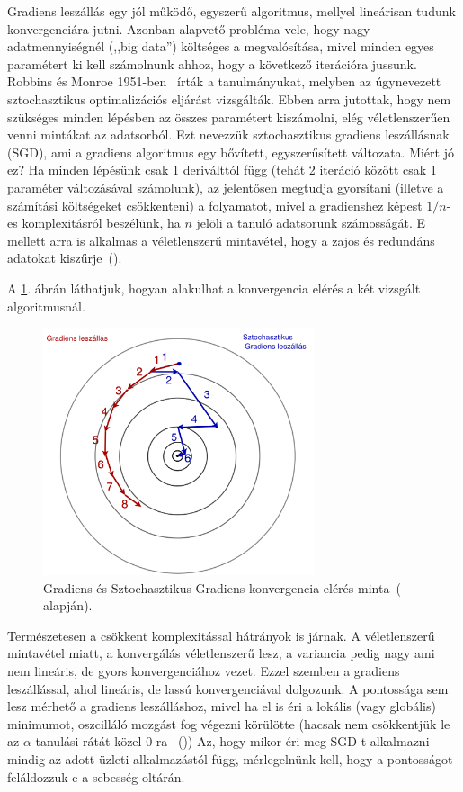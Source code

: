 \documentclass[a4paper,12pt]{article}
\begin{document}
Gradiens leszállás egy jól működő, egyszerű algoritmus, mellyel lineárisan tudunk konvergenciára jutni. Azonban alapvető probléma vele, hogy nagy adatmennyiségnél (,,big data'') költséges a megvalósítása, mivel minden egyes paramétert ki kell számolnunk ahhoz, hogy a következő iterációra jussunk. Robbins és Monroe 1951-ben~\cite{stoch1951} írták a tanulmányukat, melyben az úgynevezett sztochasztikus optimalizációs eljárást vizsgálták. Ebben arra jutottak, hogy nem szükséges minden lépésben az összes paramétert kiszámolni, elég véletlenszerűen venni mintákat az adatsorból. Ezt nevezzük sztochasztikus gradiens leszállásnak (SGD), ami a gradiens algoritmus egy bővített, egyszerűsített változata. \newline
Miért jó ez? Ha minden lépésünk csak 1 deriválttól függ (tehát 2 iteráció között csak 1 paraméter változásával számolunk), az jelentősen megtudja gyorsítani (illetve a számítási költségeket csökkenteni) a folyamatot, mivel a gradienshez képest $1/n$-es komplexitásról beszélünk, ha $n$ jelöli a tanuló adatsorunk számosságát. E mellett arra is alkalmas a véletlenszerű mintavétel, hogy a zajos és redundáns adatokat kiszűrje~(\cite{gatsby}). \newline

A \ref{sgd_bgd}. ábrán láthatjuk, hogyan alakulhat a konvergencia elérés a két vizsgált algoritmusnál. 

\begin{figure}[H]
\centering
\includegraphics[width=80mm]{img/sgd_bgd.png}
\caption{Gradiens és Sztochasztikus Gradiens konvergencia elérés minta~(\cite{alfa} alapján). \label{sgd_bgd}}
\end{figure}

Természetesen a csökkent komplexitással hátrányok is járnak. A véletlenszerű mintavétel miatt, a konvergálás véletlenszerű lesz, a variancia pedig nagy ami nem lineáris, de gyors konvergenciához vezet. Ezzel szemben a gradiens leszállással, ahol lineáris, de lassú konvergenciával dolgozunk. A pontossága sem lesz mérhető a gradiens leszálláshoz, mivel ha el is éri a lokális (vagy globális) minimumot, oszcilláló mozgást fog végezni körülötte (hacsak nem csökkentjük le az $\alpha$ tanulási rátát közel 0-ra~ (\cite{bottou}))
Az, hogy mikor éri meg SGD-t alkalmazni mindig az adott üzleti alkalmazástól függ, mérlegelnünk kell, hogy a pontosságot feláldozzuk-e a sebesség oltárán. \newline
\end{document}
